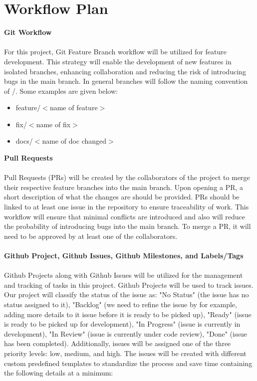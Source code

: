 \documentclass{article}
\begin{document}
\section{Workflow Plan}
\textbf{Git Workflow}\\
\\
For this project, Git Feature Branch workflow will be utilized for
feature development. This strategy will enable
the development of new features in isolated branches, enhancing
collaboration and reducing the risk of
introducing bugs in the main branch. In general branches will follow
the naming convention of /. Some
examples are given below:
\begin{itemize}
  \item feature/$<$name of feature$>$
  \item fix/$<$name of fix$>$
  \item docs/$<$name of doc changed$>$
\end{itemize}
\textbf{Pull Requests}\\
\\
Pull Requests (PRs) will be created by the collaborators of the
project to merge their respective feature
branches into the main branch. Upon opening a PR, a short description
of what the changes are should be
provided. PRs should be linked to at least one issue in the
repository to ensure traceability of work. This
workflow will ensure that minimal conflicts are introduced and also
will reduce the probability of introducing
bugs into the main branch. To merge a PR, it will need to be approved
by at least one of the collaborators.\\
\\
\textbf{Github Project, Github Issues, Github Milestones, and Labels/Tags}\\
\\
Github Projects along with Github Issues will be utilized for the
management and tracking of tasks in this
project. Github Projects will be used to track issues. Our project
will classify the status of the issue as: "No
Status" (the issue has no status assigned to it), "Backlog" (we need
  to refine the issue by for example, adding
more details to it issue before it is ready to be picked up), "Ready"
(issue is ready to be picked up for
development), "In Progress" (issue is currently in development), "In
Review" (issue is currently under code
review), "Done" (issue has been completed). Additionally, issues will
be assigned one of the three priority
levels: low, medium, and high. The issues will be created with
different custom predefined templates to
standardize the process and save time containing the following
details at a minimum:
\end{document}
